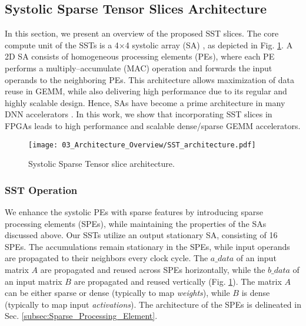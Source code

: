 \subsection{Systolic Sparse Tensor Slices Architecture}
\label{subsec:Sparse_Tensor_slices_architecture}

In this section, we present an
overview of the proposed SST slices. 
The core compute unit of the SSTs is a 4$\times$4 systolic array (SA) \cite{Kung_SA_1982}, as depicted in Fig. \ref{fig:ST_architecture}.
A 2D SA consists of homogeneous processing elements (PEs), where each PE performs a multiply--accumulate (MAC) operation and forwards the input operands to the neighboring PEs. 
This architecture allows maximization of data reuse
in GEMM, 
while also delivering high performance due to its regular and highly scalable design.
Hence, SAs have become a prime architecture in many DNN accelerators \cite{TPUV2_v3_2021, TPUv42021, S2TA_HPCA_2022, Vegeta_HPCA_2023, SA_CNN_FPGA_2017, SA_attention_FPGA_TECS_2023, Scale_sim_2020}.
In this work, we show that incorporating SST slices in FPGAs leads to high performance and scalable dense/sparse GEMM accelerators. 




\begin{figure}[tbp]
\vspace{-0.50cm}
\centering
\texttt{[image: 03\_Architecture\_Overview/SST\_architecture.pdf]}

\vspace{-0.50cm}

\caption{Systolic Sparse Tensor slice architecture.}
\label{fig:ST_architecture}

\vspace{-0.60cm}

\end{figure}


\subsubsection{SST Operation} 
We enhance the systolic PEs with sparse features by introducing sparse processing elements (SPEs), while maintaining the properties of the SAs discussed above. 
Our SSTs utilize an output stationary SA, consisting of 16 SPEs.
The accumulations remain stationary in the SPEs, while input operands are propagated to their neighbors every clock cycle.
The $a\_data$ of an input matrix $A$ are propagated and reused across SPEs horizontally, while the $b\_data$ of an input matrix $B$ are propagated and reused vertically (Fig. \ref{fig:ST_architecture}).
The matrix $A$ can be either sparse or dense (typically to map \textit{weights}), while $B$ is dense (typically to map input \textit{activations}).
The architecture of the SPEs is delineated in Sec. \ref{subsec:Sparse_Processing_Element}.


